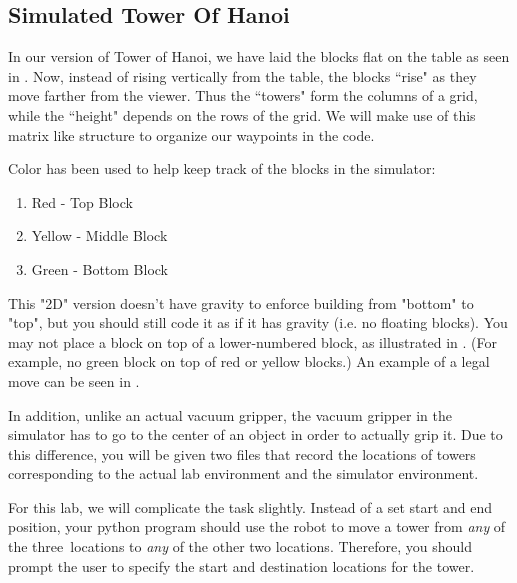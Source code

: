 \subsection{Simulated Tower Of Hanoi}
In our version of Tower of Hanoi, we have laid the blocks flat on the table as seen in .  Now, instead of rising vertically from the table, the blocks ``rise" as they move farther from the viewer.  Thus the ``towers" form the columns of a grid, while the ``height" depends on the rows of the grid.  We will make use of this matrix like structure to organize our waypoints in the code.


Color has been used to help keep track of the blocks in the simulator:
\begin{enumerate}
    \item Red - Top Block
    \item Yellow - Middle Block
    \item Green - Bottom Block
\end{enumerate}

This "2D" version doesn't have gravity to enforce building from "bottom" to "top", but you should still code it as if it has gravity (i.e. no floating blocks). You may not place a block on top of a lower-numbered block, as illustrated in . (For example, no green block on top of red or yellow blocks.)  An example of a legal move can be seen in .

In addition, unlike an actual vacuum gripper, the vacuum gripper in the simulator has to go to the center of an object in order to actually grip it. Due to this difference, you will be given two files that record the locations of towers corresponding to the actual lab environment and the simulator environment.

For this lab, we will complicate the task slightly.  Instead of a set start and end position, your python program should use the robot to move a tower from {\it any} of the three\
locations to {\it any} of the other two locations.  Therefore, you should prompt the user to specify the start and destination locations for the tower.

